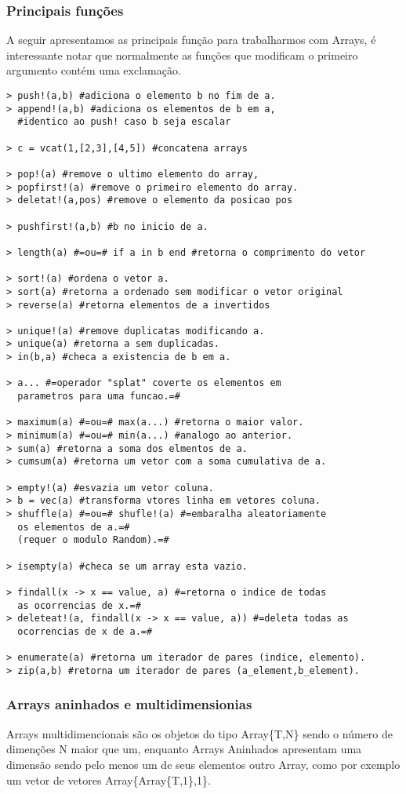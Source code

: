 \subsubsection{Principais funções}
A seguir apresentamos as principais função para trabalharmos com Arrays, é interessante notar que normalmente as funções que modificam o primeiro argumento contém uma exclamação.
\begin{lstlisting}
> push!(a,b) #adiciona o elemento b no fim de a.
> append!(a,b) #adiciona os elementos de b em a,
  #identico ao push! caso b seja escalar

> c = vcat(1,[2,3],[4,5]) #concatena arrays

> pop!(a) #remove o ultimo elemento do array,
> popfirst!(a) #remove o primeiro elemento do array.
> deletat!(a,pos) #remove o elemento da posicao pos

> pushfirst!(a,b) #b no inicio de a.

> length(a) #=ou=# if a in b end #retorna o comprimento do vetor

> sort!(a) #ordena o vetor a.
> sort(a) #retorna a ordenado sem modificar o vetor original
> reverse(a) #retorna elementos de a invertidos

> unique!(a) #remove duplicatas modificando a.
> unique(a) #retorna a sem duplicadas. 
> in(b,a) #checa a existencia de b em a.

> a... #=operador "splat" coverte os elementos em 
  parametros para uma funcao.=#

> maximum(a) #=ou=# max(a...) #retorna o maior valor.
> minimum(a) #=ou=# min(a...) #analogo ao anterior.
> sum(a) #retorna a soma dos elmentos de a.
> cumsum(a) #retorna um vetor com a soma cumulativa de a.

> empty!(a) #esvazia um vetor coluna.
> b = vec(a) #transforma vtores linha em vetores coluna.
> shuffle(a) #=ou=# shufle!(a) #=embaralha aleatoriamente 
  os elementos de a.=# 
  (requer o modulo Random).=#

> isempty(a) #checa se um array esta vazio.

> findall(x -> x == value, a) #=retorna o indice de todas
  as ocorrencias de x.=#
> deleteat!(a, findall(x -> x == value, a)) #=deleta todas as 
  ocorrencias de x de a.=#

> enumerate(a) #retorna um iterador de pares (indice, elemento).
> zip(a,b) #retorna um iterador de pares (a_element,b_element).
\end{lstlisting}

\subsubsection{Arrays aninhados e multidimensionias}
Arrays multidimencionais são os objetos do tipo Array\{T,N\} sendo o número de dimenções N maior que um, enquanto Arrays Aninhados apresentam uma dimensão sendo pelo menos um de seus elementos outro Array, como por exemplo um vetor de vetores Array\{Array\{T,1\},1\}.

